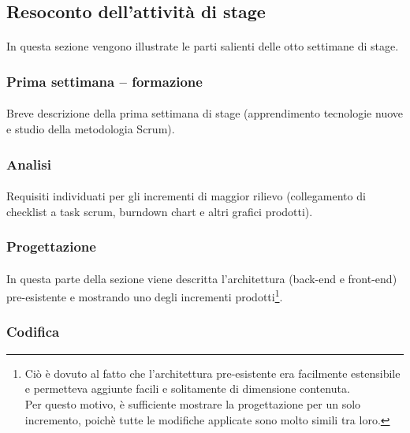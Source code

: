 \documentclass[
article,
10pt, %
oneside, %
BCOR5mm, %
]{scrartcl}
\begin{document}
\subsection{Resoconto dell'attività di stage}
\paragraph{} In questa sezione vengono illustrate le parti salienti delle otto
settimane di stage.

\subsubsection{Prima settimana -- formazione}
\paragraph{} Breve descrizione della prima settimana di stage (apprendimento
tecnologie nuove e studio della metodologia Scrum).

\subsubsection{Analisi}
\paragraph{} Requisiti individuati per gli incrementi di maggior rilievo
(collegamento di checklist a task scrum, burndown chart e altri grafici
prodotti).

\subsubsection{Progettazione}
\paragraph{} In questa parte della sezione viene descritta l'architettura
(back-end e front-end) pre-esistente e mostrando uno degli incrementi
prodotti\footnote{Ciò è dovuto al fatto che l'architettura pre-esistente era
facilmente estensibile e permetteva aggiunte facili e solitamente di
dimensione contenuta. \\
Per questo motivo, è sufficiente mostrare la progettazione per un solo
incremento, poichè tutte le modifiche applicate sono molto simili tra loro.}.

\subsubsection{Codifica}
\end{document}
